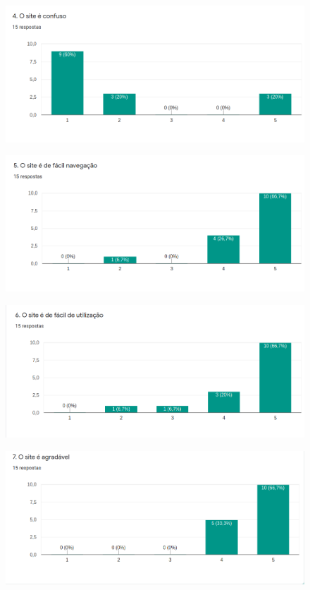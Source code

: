 \begin{apendicesenv}
\begin{figure}[h]
	\centering
	\includegraphics[keepaspectratio=true,scale=0.4]{figuras/4.png}
\end{figure}

\begin{figure}[h]
	\centering
	\includegraphics[keepaspectratio=true,scale=0.4]{figuras/5.png}
\end{figure}

\begin{figure}[h]
	\centering
	\includegraphics[keepaspectratio=true,scale=0.4]{figuras/6.png}
\end{figure}

\begin{figure}[h]
	\centering
	\includegraphics[keepaspectratio=true,scale=0.4]{figuras/7.png}
\end{figure}


\end{apendicesenv}
